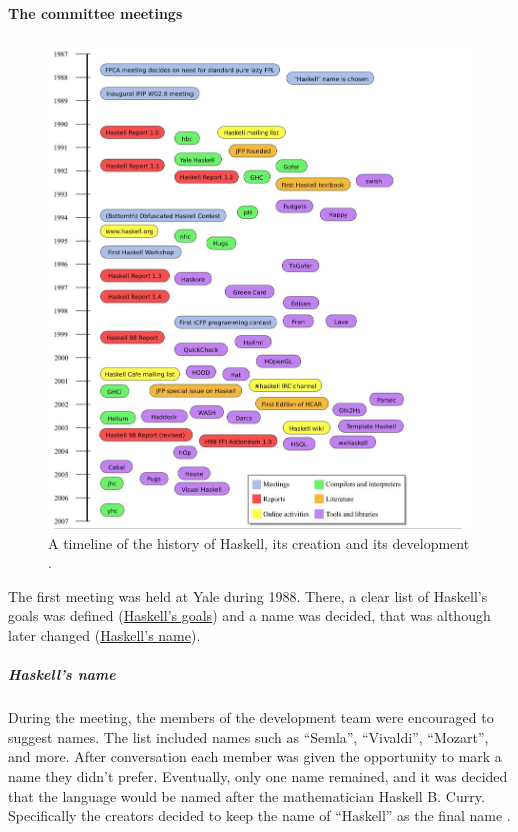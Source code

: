 \documentclass[a4paper, titlepage, twoside]{article}
\begin{document}
\paragraph*{The committee meetings}
\label{sec:org719a0b8}

\begin{figure}[htbp]
\centering
\includegraphics[width=.9\linewidth]{img/2023-05-18_12-50-04_screenshot.png}
\caption{A timeline of the history of Haskell, its creation and its development \autocite{hudakHistoryHaskellBeing2007}.}
\end{figure}

The first meeting was held at Yale during 1988. There, a clear list of Haskell's goals was defined (\hyperref[sec:orgfc3f95f]{Haskell's goals}) and a name was decided, that was although later changed (\hyperref[sec:org81aa283]{Haskell's name}).

\subparagraph*{Haskell's name}
\label{sec:org81aa283}

During the meeting, the members of the development team were encouraged to suggest names. The list included names such as ``Semla'', ``Vivaldi'', ``Mozart'', and more. After conversation each member was given the opportunity to mark a name they didn't prefer. Eventually, only one name remained, and it was decided that the language would be named after the mathematician Haskell B. Curry. Specifically the creators decided to keep the name of ``Haskell'' as the final name \autocite{hudakHistoryHaskellBeing2007}.
\end{document}

